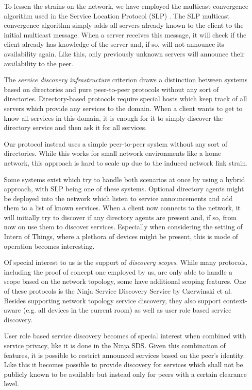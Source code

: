 To lessen the strains on the network, we have employed the multicast convergence algorithm used in the Service Location Protocol (SLP) \cite{guttman1999service}.
The SLP multicast convergence algorithm simply adds all servers already known to the client to the initial multicast message.
When a server receives this message, it will check if the client already has knowledge of the server and, if so, will not announce its availability again.
Like this, only previously unknown servers will announce their availability to the peer.

The \emph{service discovery infrastructure} criterion draws a distinction between systems based on directories and pure peer-to-peer protocols without any sort of directories.
Directory-based protocols require special hosts which keep track of all servers which provide any services to the domain.
When a client wants to get to know all services in this domain, it is enough for it to simply discover the directory service and then ask it for all services.

Our protocol instead uses a simple peer-to-peer system without any sort of directories.
While this works for small network environments like a home network, this approach is hard to scale up due to the induced network link strain.

Some systems exist which try to handle both scenarios at once by using a hybrid approach, with SLP being one of these systems.
Optional directory agents might be deployed into the network which listen to service announcements and add them to a list of known services.
When a client now connects to the network, it will initially try to discover if any directory agents are present and, if so, from now on use them to discover services.
Especially when considering the setting of Intern of Things, where a plethora of devices might be present, this is mode of operation becomes interesting.

Of special interest to us is the support of \emph{discovery scopes}.
While many protocols, including the proof of concept one employed by us, are only able to handle a scope based on the network topology, some have additional scoping features.
One of these protocols is the Ninja Service Discovery Service \cite{czerwinski1999architecture} by Czerwinski et al.
Besides supporting network topology service discovery, they also support context-aware (e.g. all devices in the current room) as well as user role based service discovery.

User role based service discovery becomes of special interest when combined with service privacy, like it is done in the Ninja SDS.
Given this combination of features, it is possible to restrict announced services based on the peer's identity.
Like this it becomes possible to provide discovery for services which shall not be publicly known to be available but instead only for peers with a certain clearance level.

